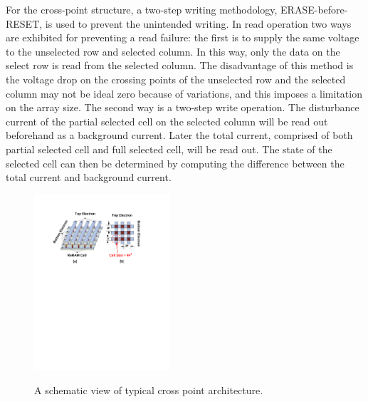 For the cross-point structure, a two-step writing methodology, ERASE-before-RESET, is used to prevent the unintended writing. In read operation two ways are exhibited for preventing a read failure: the first is to supply the same voltage to the unselected row and selected column. In this way, only the data on the select row is read from the selected column. The disadvantage of this method is the voltage drop on the crossing points of the unselected row and the selected column may not be ideal zero because of variations, and this imposes a limitation on the array size. The second way is a two-step write operation. The disturbance current of the partial selected cell on the selected column will be read out beforehand as a background current. Later the total current, comprised of both partial selected cell and full selected cell, will be read out. The state of the selected cell can then be determined by computing the difference between the total current and background current.

\begin{figure}
\centering
  \includegraphics[width=0.45\textwidth]{./figures/crossbar_array2.pdf}\\
  \caption{A schematic view of typical cross point architecture.}\label{fig:array}
\vspace{-10pt}
\end{figure}


